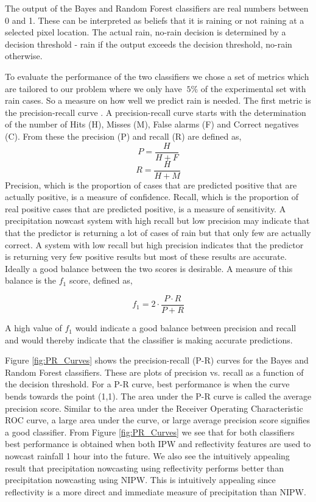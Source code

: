 \documentclass[proposal]{umassthesis}
\begin{document}
The output of the Bayes and Random Forest classifiers are real numbers between 0 and 1. These can be interpreted as beliefs that it is raining or not raining at a selected pixel location. The actual rain, no-rain decision is determined by a decision threshold - rain if the output exceeds the decision threshold, no-rain otherwise.

To evaluate the performance of the two classifiers we chose a set of metrics which are tailored to our problem where we only have $~5 \%$ of the experimental set with rain cases. So a measure on how well we predict rain is needed. The first metric is the precision-recall curve \cite{powers2011evaluation}. A precision-recall curve starts with the determination of the number of Hits (H), Misses (M), False alarms (F) and Correct negatives (C). From these the precision (P) and recall (R) are defined as,
\begin{equation}
P = \dfrac{H}{H + F}
\end{equation}
\begin{equation}
R = \dfrac{H}{H + M}
\end{equation}
Precision, which is the proportion of cases that are predicted positive that are actually positive, is a measure of confidence. Recall, which is the proportion of real positive cases that are predicted positive, is a measure of sensitivity. A precipitation nowcast system with high recall but low precision may indicate that that the predictor is returning a lot of cases of rain but that only few are actually correct. A system with low recall but high precision indicates that the predictor is returning very few positive results but most of these results are accurate. Ideally a good balance between the two scores is desirable. A measure of this balance is the $f_1$ score, defined as,

\begin{equation}
f_1 = 2 \cdot \dfrac{P \cdot R}{P + R}
\end{equation}

A high value of $f_1$ would indicate a good balance between precision and recall and would thereby indicate that the classifier is making accurate predictions.

Figure \ref{fig:PR_Curves} shows the precision-recall (P-R) curves for the Bayes and Random Forest classifiers. These are plots of precision vs. recall as a function of the decision threshold. For a P-R curve, best performance is when the curve bends towards the point (1,1). The area under the P-R curve is called the average precision score. Similar to the area under the Receiver Operating Characteristic ROC curve, a large area under the curve, or large average precision score signifies a good classifier. From Figure \ref{fig:PR_Curves} we see that for both classifiers best performance is obtained when both IPW and reflectivity features are used to nowcast rainfall 1 hour into the future. We also see the intuitively appealing result that precipitation nowcasting using reflectivity performs better than precipitation nowcasting using NIPW. This is intuitively appealing since reflectivity is a more direct and immediate measure of precipitation than NIPW. 
\end{document}
